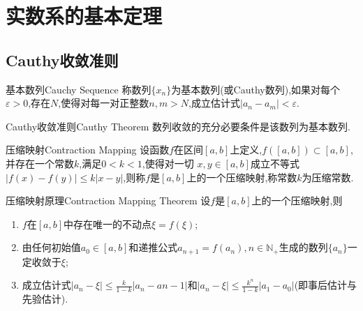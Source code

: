 \documentclass[cn,chinese,founder]{elegantbook}
\begin{document}
    \chapter{实数系的基本定理}
        \section{Cauthy收敛准则}
        
        \begin{definition}{基本数列}{Cauchy Sequence}
            称数列$\{x_n\}$为基本数列(或Cauthy数列),如果对每个$\varepsilon>0$,存在$N$,使得对每一对正整数$n,m>N$,成立估计式$\lvert a_n-a_m\rvert<\varepsilon$.
        \end{definition}
        
        \begin{theorem}{Cauthy收敛准则}{Cauthy Theorem} 
            数列收敛的充分必要条件是该数列为基本数列.
        \end{theorem}
        
        \begin{definition}{压缩映射}{Contraction Mapping}
            设函数$f$在区间$[a,b]$上定义,$f([a,b])\subset [a,b]$,并存在一个常数$k$,满足$0<k<1$,使得对一切 $x,y\in [a,b]$成立不等式$\lvert f(x)-f(y)\rvert\leqslant k\lvert x-y\rvert$,则称$f$是$[a,b]$上的一个压缩映射,称常数$k$为压缩常数.
        \end{definition}
        \begin{theorem}{压缩映射原理}{Contraction Mapping Theorem}
            设$f$是$[a,b]$上的一个压缩映射,则
            \begin{enumerate}
                \item $f$在$[a,b]$中存在唯一的不动点$\xi=f(\xi)$;
                \item 由任何初始值$a_0\in[a,b]$和递推公式$a_{n+1}=f(a_n),n\in \mathbb{N}_+$生成的数列$\{a_n\}$一定收敛于$\xi$;
                \item 成立估计式$\lvert a_n-\xi\rvert\leqslant\frac{k}{1-k}\lvert a_n-a{n-1}\rvert$和$\lvert a_n-\xi\rvert\leqslant\frac{k^n}{1-k}\lvert a_1-a_0\rvert$(即事后估计与先验估计).
            \end{enumerate}
        \end{theorem}
\end{document}
